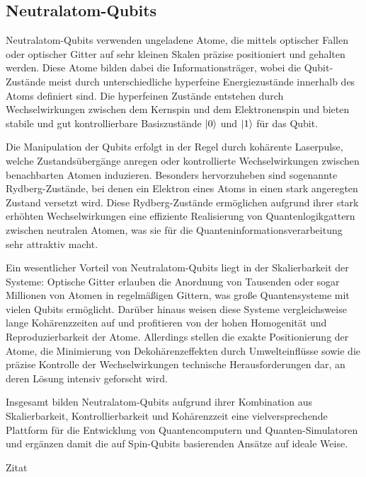 \subsection{Neutralatom-Qubits}

Neutralatom-Qubits verwenden ungeladene Atome, die mittels optischer Fallen oder optischer Gitter auf sehr kleinen Skalen präzise positioniert und gehalten werden. Diese Atome bilden dabei die Informationsträger, wobei die Qubit-Zustände meist durch unterschiedliche hyperfeine Energiezustände innerhalb des Atoms definiert sind. Die hyperfeinen Zustände entstehen durch Wechselwirkungen zwischen dem Kernspin und dem Elektronenspin und bieten stabile und gut kontrollierbare Basiszustände \(\ket{0}\) und \(\ket{1}\) für das Qubit.

Die Manipulation der Qubits erfolgt in der Regel durch kohärente Laserpulse, welche Zustandsübergänge anregen oder kontrollierte Wechselwirkungen zwischen benachbarten Atomen induzieren. Besonders hervorzuheben sind sogenannte Rydberg-Zustände, bei denen ein Elektron eines Atoms in einen stark angeregten Zustand versetzt wird. Diese Rydberg-Zustände ermöglichen aufgrund ihrer stark erhöhten Wechselwirkungen eine effiziente Realisierung von Quantenlogikgattern zwischen neutralen Atomen, was sie für die Quanteninformationsverarbeitung sehr attraktiv macht.

Ein wesentlicher Vorteil von Neutralatom-Qubits liegt in der Skalierbarkeit der Systeme: Optische Gitter erlauben die Anordnung von Tausenden oder sogar Millionen von Atomen in regelmäßigen Gittern, was große Quantensysteme mit vielen Qubits ermöglicht. Darüber hinaus weisen diese Systeme vergleichsweise lange Kohärenzzeiten auf und profitieren von der hohen Homogenität und Reproduzierbarkeit der Atome. Allerdings stellen die exakte Positionierung der Atome, die Minimierung von Dekohärenzeffekten durch Umwelteinflüsse sowie die präzise Kontrolle der Wechselwirkungen technische Herausforderungen dar, an deren Lösung intensiv geforscht wird.

Insgesamt bilden Neutralatom-Qubits aufgrund ihrer Kombination aus Skalierbarkeit, Kontrollierbarkeit und Kohärenzzeit eine vielversprechende Plattform für die Entwicklung von Quantencomputern und Quanten-Simulatoren und ergänzen damit die auf Spin-Qubits basierenden Ansätze auf ideale Weise.





Zitat \cite{alhazmi_live_2024}

\cite{bergou_quantum_2021}

\printbibliography
